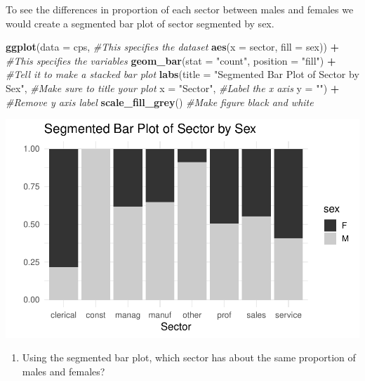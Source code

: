 \documentclass[
]{report}
\newenvironment{Shaded}{\begin{snugshade}}{\end{snugshade}}
\newcommand{\CommentTok}[1]{\textcolor[rgb]{0.56,0.35,0.01}{\textit{#1}}}
\newcommand{\DataTypeTok}[1]{\textcolor[rgb]{0.13,0.29,0.53}{#1}}
\newcommand{\KeywordTok}[1]{\textcolor[rgb]{0.13,0.29,0.53}{\textbf{#1}}}
\newcommand{\NormalTok}[1]{#1}
\newcommand{\OperatorTok}[1]{\textcolor[rgb]{0.81,0.36,0.00}{\textbf{#1}}}
\newcommand{\StringTok}[1]{\textcolor[rgb]{0.31,0.60,0.02}{#1}}
\providecommand{\tightlist}{%
  \setlength{\itemsep}{0pt}\setlength{\parskip}{0pt}}
\begin{document}
To see the differences in proportion of each sector between males and females we would create a segmented bar plot of sector segmented by sex.

\begin{Shaded}
\begin{Highlighting}[]
\KeywordTok{ggplot}\NormalTok{(}\DataTypeTok{data =}\NormalTok{ cps,   }\CommentTok{#This specifies the dataset}
       \KeywordTok{aes}\NormalTok{(}\DataTypeTok{x =}\NormalTok{ sector, }\DataTypeTok{fill =}\NormalTok{ sex)) }\OperatorTok{+}\StringTok{   }\CommentTok{#This specifies the variables}
\StringTok{  }\KeywordTok{geom_bar}\NormalTok{(}\DataTypeTok{stat =} \StringTok{"count"}\NormalTok{, }\DataTypeTok{position =} \StringTok{"fill"}\NormalTok{) }\OperatorTok{+}\StringTok{  }\CommentTok{#Tell it to make a stacked bar plot}
\StringTok{  }\KeywordTok{labs}\NormalTok{(}\DataTypeTok{title =} \StringTok{"Segmented Bar Plot of Sector by Sex"}\NormalTok{,  }\CommentTok{#Make sure to title your plot }
       \DataTypeTok{x =} \StringTok{"Sector"}\NormalTok{,   }\CommentTok{#Label the x axis}
       \DataTypeTok{y =} \StringTok{""}\NormalTok{) }\OperatorTok{+}\StringTok{  }\CommentTok{#Remove y axis label}
\StringTok{    }\KeywordTok{scale_fill_grey}\NormalTok{()  }\CommentTok{#Make figure black and white}
\end{Highlighting}
\end{Shaded}

\begin{center}\includegraphics[width=0.6\linewidth]{03-EDA-categorical_files/figure-latex/unnamed-chunk-5-1} \end{center}

\begin{enumerate}
\def\labelenumi{\arabic{enumi}.}
\setcounter{enumi}{5}
\tightlist
\item
  Using the segmented bar plot, which sector has about the same proportion of males and females?
\end{enumerate}

\vspace{0.5in}
\end{document}

